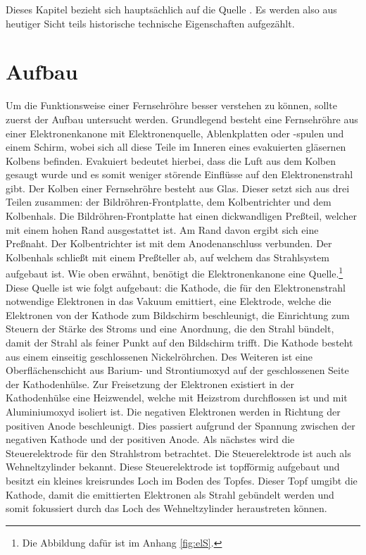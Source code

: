 Dieses Kapitel bezieht sich hauptsächlich auf die Quelle \cite{Fernsehroehre}.
Es werden also aus heutiger Sicht teils historische technische Eigenschaften aufgezählt.
\section{Aufbau}
\label{sec:aufbau}
Um die Funktionsweise einer Fernsehröhre besser verstehen zu können, sollte zuerst der Aufbau untersucht werden.
Grundlegend besteht eine Fernsehröhre aus einer Elektronenkanone mit Elektronenquelle, Ablenkplatten oder -spulen und einem Schirm, wobei sich all diese Teile im Inneren eines evakuierten gläsernen Kolbens befinden.
Evakuiert bedeutet hierbei, dass die Luft aus dem Kolben gesaugt wurde und es somit weniger störende Einflüsse auf den Elektronenstrahl gibt.
Der Kolben einer Fernsehröhre besteht aus Glas.
Dieser setzt sich aus drei Teilen zusammen: der Bildröhren-Frontplatte, dem Kolbentrichter und dem Kolbenhals.
Die Bildröhren-Frontplatte hat einen dickwandligen Preßteil, welcher mit einem hohen Rand ausgestattet ist.
Am Rand davon ergibt sich eine Preßnaht.
Der Kolbentrichter ist mit dem Anodenanschluss verbunden.
Der Kolbenhals schließt mit einem Preßteller ab, auf welchem das Strahlsystem aufgebaut ist.
Wie oben erwähnt, benötigt die Elektronenkanone eine Quelle.\footnote{Die Abbildung dafür ist im Anhang \ref{fig:elS}.}
Diese Quelle ist wie folgt aufgebaut: die Kathode, die für den Elektronenstrahl notwendige Elektronen in das Vakuum emittiert, eine Elektrode, welche die Elektronen von der Kathode zum Bildschirm beschleunigt, die Einrichtung zum Steuern der Stärke des Stroms und eine Anordnung, die den Strahl bündelt, damit der Strahl als feiner Punkt auf den Bildschirm trifft. 
Die Kathode besteht aus einem einseitig geschlossenen Nickelröhrchen.
Des Weiteren ist eine Oberflächenschicht aus Barium- und Strontiumoxyd auf der geschlossenen Seite der Kathodenhülse.
Zur Freisetzung der Elektronen existiert in der Kathodenhülse eine Heizwendel, welche mit Heizstrom durchflossen ist und mit Aluminiumoxyd isoliert ist.
Die negativen Elektronen werden in Richtung der positiven Anode beschleunigt.
Dies passiert aufgrund der Spannung zwischen der negativen Kathode und der positiven Anode.
Als nächstes wird die Steuerelektrode für den Strahlstrom betrachtet.
Die Steuerelektrode ist auch als Wehneltzylinder bekannt.
Diese Steuerelektrode ist topfförmig aufgebaut und besitzt ein kleines kreisrundes Loch im Boden des Topfes.
Dieser Topf umgibt die Kathode, damit die emittierten Elektronen als Strahl gebündelt werden und somit fokussiert durch das Loch des Wehneltzylinder heraustreten können.
